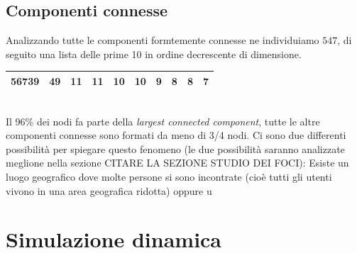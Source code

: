 \documentclass[a4paper]{article}
\newcommand{\lcc}{\textit{largest connected component}}
\begin{document}
\subsection{Componenti connesse}
Analizzando tutte le componenti formtemente connesse ne individuiamo $547$, di seguito una lista delle prime 10 in ordine decrescente di dimensione.\\
\begin{tabular}{ | c | c | c | c | c | c | c | c | c | c | }
  \hline
  56739 & 49 & 11 & 11 & 10 & 10 & 9 & 8 & 8 & 7\\
  \hline
\end{tabular}\\
Il 96\% dei nodi fa parte della \lcc, tutte le altre componenti connesse sono formati da meno di 3/4 nodi. 
Ci sono due differenti possibilità per spiegare questo fenomeno (le due possibilità saranno analizzate meglione nella sezione CITARE LA SEZIONE STUDIO DEI FOCI): Esiste un luogo geografico dove molte persone si sono incontrate (cioè tutti gli utenti vivono in una area geografica ridotta) oppure u
\section{Simulazione dinamica}
\end{document}
